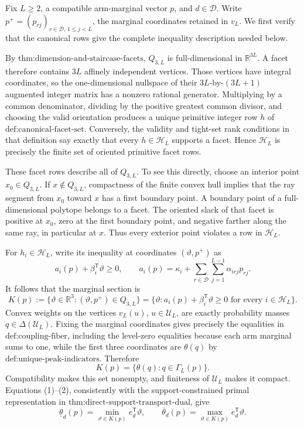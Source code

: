 Fix \(L\geq 2\), a compatible arm-marginal vector \(p\), and \(d\in\mathcal D\).  Write \(p^+=(p_{rj})_{r\in\mathcal D,\,1\leq j<L}\), the marginal coordinates retained in \(v_L\).  We first verify that the canonical rows give the complete inequality description needed below.

By \(\text{thm:dimension-and-staircase-facets}\), \(Q_{3,L}\) is full-dimensional in \(\mathbb R^{3L}\).  A facet therefore contains \(3L\) affinely independent vertices.  Those vertices have integral coordinates, so the one-dimensional nullspace of their \(3L\)-by-\((3L+1)\) augmented integer matrix has a nonzero rational generator.  Multiplying by a common denominator, dividing by the positive greatest common divisor, and choosing the valid orientation produces a unique primitive integer row \(h\) of \(\text{def:canonical-facet-set}\).  Conversely, the validity and tight-set rank conditions in that definition say exactly that every \(h\in\mathcal H_L\) supports a facet.  Hence \(\mathcal H_L\) is precisely the finite set of oriented primitive facet rows.

These facet rows describe all of \(Q_{3,L}\).  To see this directly, choose an interior point \(x_0\in Q_{3,L}\).  If \(x\notin Q_{3,L}\), compactness of the finite convex hull implies that the ray segment from \(x_0\) toward \(x\) has a first boundary point.  A boundary point of a full-dimensional polytope belongs to a facet.  The oriented slack of that facet is positive at \(x_0\), zero at the first boundary point, and negative farther along the same ray, in particular at \(x\).  Thus every exterior point violates a row in \(\mathcal H_L\).

For \(h_i\in\mathcal H_L\), write its inequality at coordinates \((\vartheta,p^+)\) as
\[
 a_i(p)+\beta_i^{\mathsf T}\vartheta\geq0,
 \qquad
 a_i(p)=\kappa_i+\sum_{r\in\mathcal D}\sum_{j=1}^{L-1}\alpha_{irj}p_{rj}.
\]
It follows that the marginal section is
\[
 K(p):=\{\vartheta\in\mathbb R^3:(\vartheta,p^+)\in Q_{3,L}\}
 =\{\vartheta:a_i(p)+\beta_i^{\mathsf T}\vartheta\geq0
       \text{ for every }i\in\mathcal H_L\}.
 \tag{1}
\]
Convex weights on the vertices \(v_L(u)\), \(u\in\mathcal U_L\), are exactly probability masses \(q\in\Delta(\mathcal U_L)\).  Fixing the marginal coordinates gives precisely the equalities in \(\text{def:coupling-fiber}\), including the level-zero equalities because each arm marginal sums to one, while the first three coordinates are \(\theta(q)\) by \(\text{def:unique-peak-indicators}\).  Therefore
\[
 K(p)=\{\theta(q):q\in\Gamma_L(p)\}.                 \tag{2}
\]
Compatibility makes this set nonempty, and finiteness of \(\mathcal U_L\) makes it compact.  Equations (1)--(2), consistently with the support-constrained primal representation in \(\text{thm:direct-support-transport-dual}\), give
\[
 \underline\theta_d(p)=\min_{\vartheta\in K(p)}e_d^{\mathsf T}\vartheta,
 \qquad
 \overline\theta_d(p)=\max_{\vartheta\in K(p)}e_d^{\mathsf T}\vartheta.       \tag{3}
\]

